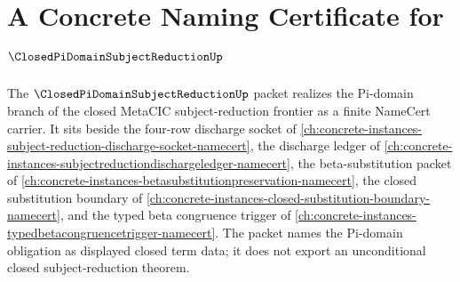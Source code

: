 \chapter{A Concrete Naming Certificate for $\ClosedPiDomainSubjectReductionUp$}
\label{ch:concrete-instances-closed-pi-domain-subject-reduction-namecert}

The $\ClosedPiDomainSubjectReductionUp$ packet realizes the Pi-domain branch of the closed MetaCIC subject-reduction frontier as a finite NameCert carrier. It sits beside the four-row discharge socket of \autoref{ch:concrete-instances-subject-reduction-discharge-socket-namecert}, the discharge ledger of \autoref{ch:concrete-instances-subjectreductiondischargeledger-namecert}, the beta-substitution packet of \autoref{ch:concrete-instances-betasubstitutionpreservation-namecert}, the closed substitution boundary of \autoref{ch:concrete-instances-closed-substitution-boundary-namecert}, and the typed beta congruence trigger of \autoref{ch:concrete-instances-typedbetacongruencetrigger-namecert}. The packet names the Pi-domain obligation as displayed closed term data; it does not export an unconditional closed subject-reduction theorem.

